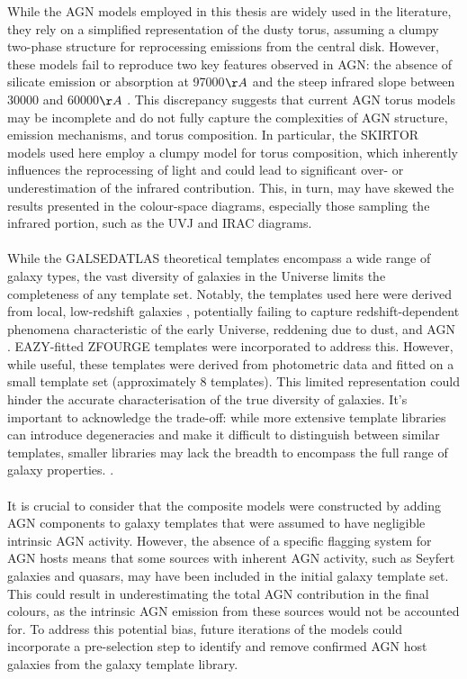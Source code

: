 While the AGN models employed in this thesis are widely used in the literature, they rely on a simplified representation of the dusty torus, assuming a clumpy two-phase structure for reprocessing emissions from the central disk.  However, these models fail to reproduce two key features observed in AGN: the absence of silicate emission or absorption at 97000$\AA$ and the steep infrared slope between 30000 and 60000$\AA$ \citep{cruz_modeling_2023}. This discrepancy suggests that current AGN torus models may be incomplete and do not fully capture the complexities of AGN structure, emission mechanisms, and torus composition.  In particular, the SKIRTOR models used here employ a clumpy model for torus composition, which inherently influences the reprocessing of light and could lead to significant over- or underestimation of the infrared contribution. This, in turn, may have skewed the results presented in the colour-space diagrams, especially those sampling the infrared portion, such as the UVJ and IRAC diagrams.\\\\ While the GALSEDATLAS theoretical templates encompass a wide range of galaxy types, the vast diversity of galaxies in the Universe limits the completeness of any template set. Notably, the templates used here were derived from local, low-redshift galaxies \citep{brown_atlas_2014}, potentially failing to capture redshift-dependent phenomena characteristic of the early Universe, reddening due to dust, and AGN \citep{polletta_spectral_2007}. EAZY-fitted ZFOURGE templates \citep{brammer_eazy_2008, forrest_zfourge_2018} were incorporated to address this. However, while useful, these templates were derived from photometric data and fitted on a small template set (approximately 8 templates). This limited representation could hinder the accurate characterisation of the true diversity of galaxies.  It's important to acknowledge the trade-off: while more extensive template libraries can introduce degeneracies and make it difficult to distinguish between similar templates, smaller libraries may lack the breadth to encompass the full range of galaxy properties. \citep{steinhardt_templates_2023}. \\\\It is crucial to consider that the composite models were constructed by adding AGN components to galaxy templates that were assumed to have negligible intrinsic AGN activity. However, the absence of a specific flagging system for AGN hosts means that some sources with inherent AGN activity, such as Seyfert galaxies and quasars, may have been included in the initial galaxy template set. This could result in underestimating the total AGN contribution in the final colours, as the intrinsic AGN emission from these sources would not be accounted for. To address this potential bias, future iterations of the models could incorporate a pre-selection step to identify and remove confirmed AGN host galaxies from the galaxy template library. \\\\
